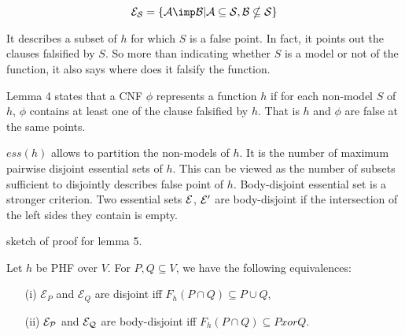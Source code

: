 \documentclass[a4paper]{report}
\begin{document}
	\[ \cal{E}_S = \{ A \imp B | A \subseteq S, B \nsubseteq S \} \]
	
It describes a subset of $h$ for which $S$ is a false point. In fact, it points
out the clauses falsified by $S$. So more than indicating whether $S$ is a model
or not of the function, it also says where does it falsify the function.

Lemma 4 states that a CNF $\phi$ represents a function $h$ if for each non-model
$S$ of $h$, $\phi$ contains at least one of the clause falsified by $h$. That is
$h$ and $\phi$ are false at the same points.

$ess(h)$ allows to partition the non-models of $h$. It is the number of maximum
pairwise disjoint essential sets of $h$. This can be viewed as the number of
subsets sufficient to disjointly describes false point of $h$. Body-disjoint 
essential set is a stronger criterion. Two essential sets $\cal{E}$, $\cal{E}'$
are body-disjoint if the intersection of the left sides they contain is empty.

sketch of proof for lemma 5. 

\begin{lemma} Let $h$ be PHF over $V$. For $P, Q \subseteq V$, we have the 
following equivalences:

\begin{itemize}
	\item[(i)] $\mathcal{E}_P$ and $\mathcal{E}_Q$ are disjoint iff $F_h(P \cap
		Q) \subseteq P \cup Q$,
	
	\item[(ii)] $\cal{E}_P$ and $\cal{E}_Q$ are body-disjoint iff $F_h(P
	 	\cap Q) \subseteq P xor Q$.
\end{itemize}
	
\end{lemma} 
\end{document}
